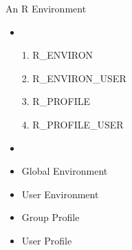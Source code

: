 \documentclass{beamer}
\begin{document}
\begin{frame}{An R Environment}

\bigskip

\begin{minipage}{0.45\textwidth}

\begin{itemize}
\item
\item[1.] R\_ENVIRON\\
\item[2.] R\_ENVIRON\_USER\\
\item[3.] R\_PROFILE\\
\item[4.] R\_PROFILE\_USER\\
\end{itemize}

\end{minipage}
\begin{minipage}{0.45\textwidth}

\begin{itemize}
\item
\item {\color{red} Global Environment\\}
\item {\color{blue} User Environment\\}
\item {\color{blue} Group Profile\\}
\item {\color{green} User Profile\\}
\end{itemize}

\end{minipage}

\bigskip

\end{frame}
\end{document}
